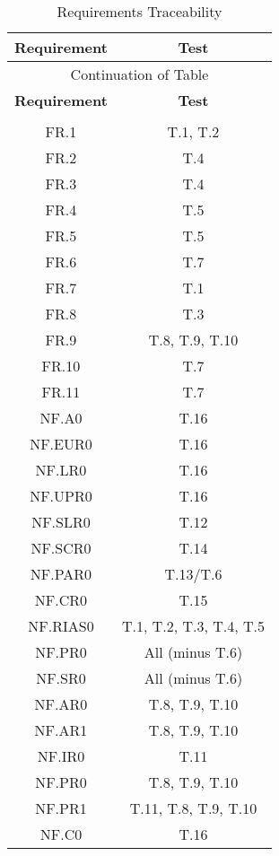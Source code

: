 \documentclass[12pt, titlepage]{article}
\begin{document}
\begin{longtable}[h] {|c|c|}
\hline
\textbf{Requirement} & \textbf{Test} \\
\hline
\endfirsthead

\hline
\multicolumn{2}{|c|}{Continuation of Table}\\
\hline
\textbf{Requirement} & \textbf{Test} \\
\hline
\endhead

\hline
\endfoot

\hline
\multicolumn{2}{| c |}{End of Table}\\
\hline
\caption{Requirements Traceability}
\label{tab:Traceability}
\endlastfoot


FR.1 & T.1, T.2\\
FR.2 & T.4\\
FR.3 & T.4\\
FR.4 & T.5\\
FR.5 & T.5\\
FR.6 & T.7\\
FR.7 & T.1\\
FR.8 & T.3\\
FR.9 & T.8, T.9, T.10\\
FR.10 & T.7\\
FR.11 & T.7\\

\pagebreak
NF.A0 & T.16 \\
NF.EUR0 & T.16 \\
NF.LR0 & T.16 \\
NF.UPR0 & T.16 \\
NF.SLR0 & T.12 \\ 
NF.SCR0 & T.14 \\
NF.PAR0 & T.13/T.6 \\
NF.CR0 & T.15 \\
NF.RIAS0 & T.1, T.2, T.3, T.4, T.5\\
NF.PR0 & All (minus T.6) \\
NF.SR0 & All (minus T.6) \\ 
NF.AR0 & T.8, T.9, T.10 \\
NF.AR1 & T.8, T.9, T.10 \\
NF.IR0 & T.11 \\
NF.PR0 & T.8, T.9, T.10 \\
NF.PR1 & T.11, T.8, T.9, T.10 \\
NF.C0 & T.16 \\

\end{longtable}

\newpage
\end{document}

